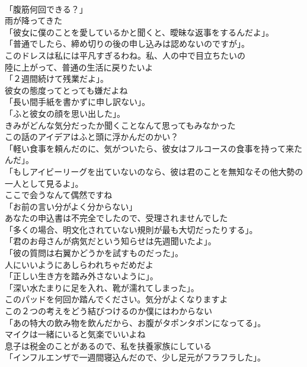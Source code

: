 \documentclass[8pt]{extreport}
\begin{document}
\begin{CJK}{UTF8}{min}
\\	「腹筋何回できる？」	
\\	雨が降ってきた	
\\	「彼女に僕のことを愛しているかと聞くと、曖昧な返事をするんだよ」。	
\\	「普通でしたら、締め切りの後の申し込みは認めないのですが」。	
\\	このドレスは私には平凡すぎるわね。私、人の中で目立ちたいの	
\\	陸に上がって、普通の生活に戻りたいよ	
\\	「２週間続けて残業だよ」。	
\\	彼女の態度ってとっても嫌だよね	
\\	「長い間手紙を書かずに申し訳ない」。	
\\	「ふと彼女の顔を思い出した」。	
\\	きみがどんな気分だったか聞くことなんて思ってもみなかった	
\\	この話のアイデアはふと頭に浮かんだのかい？	
\\	「軽い食事を頼んだのに、気がついたら、彼女はフルコースの食事を持って来たんだ」。	
\\	「もしアイビーリーグを出ていないのなら、彼は君のことを無知なその他大勢の一人として見るよ」。	
\\	ここで会うなんて偶然ですね	
\\	「お前の言い分がよく分からない」	
\\	あなたの申込書は不完全でしたので、受理されませんでした	
\\	「多くの場合、明文化されていない規則が最も大切だったりする」。	
\\	「君のお母さんが病気だという知らせは先週聞いたよ」。	
\\	「彼の質問は右翼かどうかを試すものだった」。	
\\	人にいいようにあしらわれちゃだめだよ	
\\	「正しい生き方を踏み外さないように」。	
\\	「深い水たまりに足を入れ、靴が濡れてしまった」。	
\\	このパッドを何回か踏んでください。気分がよくなりますよ	
\\	この２つの考えをどう結びつけるのか僕にはわからない	
\\	「あの特大の飲み物を飲んだから、お腹がタポンタポンになってる」。	
\\	マイクは一緒にいると気楽でいいよね	
\\	息子は税金のことがあるので、私を扶養家族にしている	
\\	「インフルエンザで一週間寝込んだので、少し足元がフラフラした」。	

\end{CJK}
\end{document}
